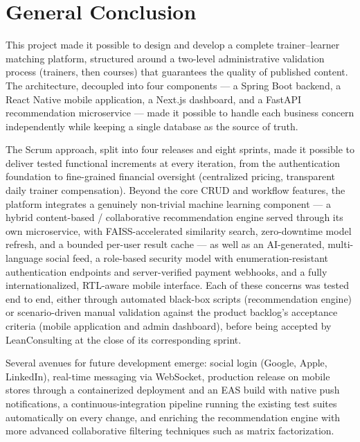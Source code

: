 \documentclass[a4paper,12pt]{report}
\begin{document}
\chapter*{General Conclusion}

This project made it possible to design and develop a complete
trainer--learner matching platform, structured around a two-level
administrative validation process (trainers, then courses) that guarantees
the quality of published content. The architecture, decoupled into four
components --- a Spring Boot backend, a React Native mobile application, a
Next.js dashboard, and a FastAPI recommendation microservice --- made it
possible to handle each business concern independently while keeping a
single database as the source of truth.

The Scrum approach, split into four releases and eight sprints, made it
possible to deliver tested functional increments at every iteration, from
the authentication foundation to fine-grained financial oversight
(centralized pricing, transparent daily trainer compensation). Beyond the
core CRUD and workflow features, the platform integrates a genuinely
non-trivial machine learning component --- a hybrid content-based /
collaborative recommendation engine served through its own microservice,
with FAISS-accelerated similarity search, zero-downtime model refresh, and
a bounded per-user result cache --- as well as an AI-generated,
multi-language social feed, a role-based security model with
enumeration-resistant authentication endpoints and server-verified payment
webhooks, and a fully internationalized, RTL-aware mobile interface. Each
of these concerns was tested end to end, either through automated
black-box scripts (recommendation engine) or scenario-driven manual
validation against the product backlog's acceptance criteria (mobile
application and admin dashboard), before being accepted by LeanConsulting
at the close of its corresponding sprint.

Several avenues for future development emerge: social login (Google,
Apple, LinkedIn), real-time messaging via WebSocket, production release on
mobile stores through a containerized deployment and an EAS build with
native push notifications, a continuous-integration pipeline running the
existing test suites automatically on every change, and enriching the
recommendation engine with more advanced collaborative filtering
techniques such as matrix factorization.
\end{document}
